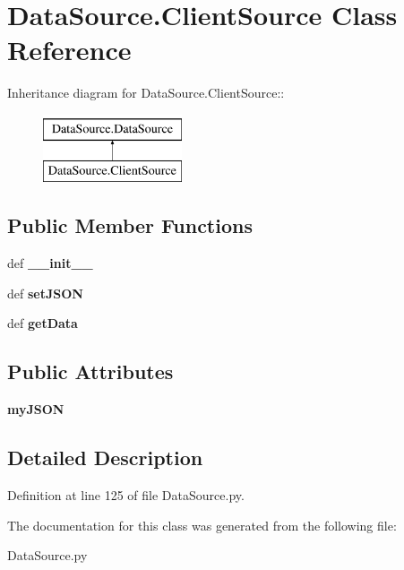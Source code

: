 \hypertarget{classDataSource_1_1ClientSource}{
\section{DataSource.ClientSource Class Reference}
\label{classDataSource_1_1ClientSource}
}
Inheritance diagram for DataSource.ClientSource::\begin{figure}[H]
\begin{center}
\leavevmode
\includegraphics[height=2cm]{classDataSource_1_1ClientSource}
\end{center}
\end{figure}
\subsection*{Public Member Functions}
\begin{DoxyCompactItemize}
\item 
\hypertarget{classDataSource_1_1ClientSource_a24399ccfe037cd809da40142838feddc}{
def {\bfseries \_\-\_\-init\_\-\_\-}}
\label{classDataSource_1_1ClientSource_a24399ccfe037cd809da40142838feddc}

\item 
\hypertarget{classDataSource_1_1ClientSource_a1c021f74586206e3f81b7101a73ad506}{
def {\bfseries setJSON}}
\label{classDataSource_1_1ClientSource_a1c021f74586206e3f81b7101a73ad506}

\item 
\hypertarget{classDataSource_1_1ClientSource_a5b3cb19035b888e45cc22aa3a186b49d}{
def {\bfseries getData}}
\label{classDataSource_1_1ClientSource_a5b3cb19035b888e45cc22aa3a186b49d}

\end{DoxyCompactItemize}
\subsection*{Public Attributes}
\begin{DoxyCompactItemize}
\item 
\hypertarget{classDataSource_1_1ClientSource_ac39eb1a465b3588658ed953a8f896955}{
{\bfseries myJSON}}
\label{classDataSource_1_1ClientSource_ac39eb1a465b3588658ed953a8f896955}

\end{DoxyCompactItemize}


\subsection{Detailed Description}


Definition at line 125 of file DataSource.py.

The documentation for this class was generated from the following file:\begin{DoxyCompactItemize}
\item 
DataSource.py\end{DoxyCompactItemize}
